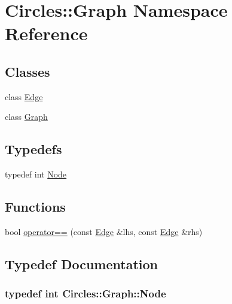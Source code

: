 \hypertarget{namespace_circles_1_1_graph}{}\section{Circles\+:\+:Graph Namespace Reference}
\label{namespace_circles_1_1_graph}
\subsection*{Classes}
\begin{DoxyCompactItemize}
\item 
class \hyperlink{class_circles_1_1_graph_1_1_edge}{Edge}
\item 
class \hyperlink{class_circles_1_1_graph_1_1_graph}{Graph}
\end{DoxyCompactItemize}
\subsection*{Typedefs}
\begin{DoxyCompactItemize}
\item 
typedef int \hyperlink{namespace_circles_1_1_graph_afab3817d1ee8e2074e82866c27a1058b}{Node}
\end{DoxyCompactItemize}
\subsection*{Functions}
\begin{DoxyCompactItemize}
\item 
bool \hyperlink{namespace_circles_1_1_graph_a77922e41074a56d81cb1f75767b6b013}{operator==} (const \hyperlink{class_circles_1_1_graph_1_1_edge}{Edge} \&lhs, const \hyperlink{class_circles_1_1_graph_1_1_edge}{Edge} \&rhs)
\end{DoxyCompactItemize}


\subsection{Typedef Documentation}
\hypertarget{namespace_circles_1_1_graph_afab3817d1ee8e2074e82866c27a1058b}{}
\subsubsection[{Node}]{\setlength{\rightskip}{0pt plus 5cm}typedef int {\bf Circles\+::\+Graph\+::\+Node}}\label{namespace_circles_1_1_graph_afab3817d1ee8e2074e82866c27a1058b}


